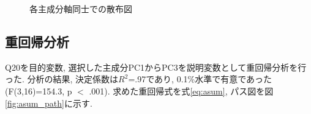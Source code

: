 \documentclass[12pt, a4j]{jsarticle}
\begin{document}
      \begin{figure}
        \begin{center}
          \hfill
          \hfill 
        \end{center}
        \vspace{-0.5cm}
        \caption{各主成分軸同士での散布図}
        \label{fig:asum_sc}
      \end{figure}
    \subsection{重回帰分析}
      Q20を目的変数, 選択した主成分PC1からPC3を説明変数として重回帰分析を行った. 
      分析の結果, 決定係数は$R^2$=.97であり, 0.1\%水準で有意であった(F(3,16)=154.3, p $<$ .001). 
      求めた重回帰式を式\ref{eq:asum}, パス図を図\ref{fig:asum_path}に示す. 
\end{document}

